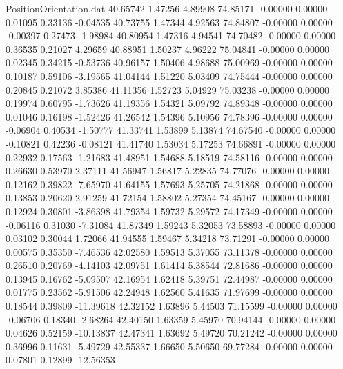 \begin{filecontents}{PositionOrientation.dat}
  40.65742    1.47256    4.89908    74.85171   -0.00000    0.00000    0.01095    0.33136   -0.04535
  40.73755    1.47344    4.92563    74.84807   -0.00000    0.00000   -0.00397    0.27473   -1.98984
  40.80954    1.47316    4.94541    74.70482   -0.00000    0.00000    0.36535    0.21027    4.29659
  40.88951    1.50237    4.96222    75.04841   -0.00000    0.00000    0.02345    0.34215   -0.53736
  40.96157    1.50406    4.98688    75.00969   -0.00000    0.00000    0.10187    0.59106   -3.19565
  41.04144    1.51220    5.03409    74.75444   -0.00000    0.00000    0.20845    0.21072    3.85386
  41.11356    1.52723    5.04929    75.03238   -0.00000    0.00000    0.19974    0.60795   -1.73626
  41.19356    1.54321    5.09792    74.89348   -0.00000    0.00000    0.01046    0.16198   -1.52426
  41.26542    1.54396    5.10956    74.78396   -0.00000    0.00000   -0.06904    0.40534   -1.50777
  41.33741    1.53899    5.13874    74.67540   -0.00000    0.00000   -0.10821    0.42236   -0.08121
  41.41740    1.53034    5.17253    74.66891   -0.00000    0.00000    0.22932    0.17563   -1.21683
  41.48951    1.54688    5.18519    74.58116   -0.00000    0.00000    0.26630    0.53970    2.37111
  41.56947    1.56817    5.22835    74.77076   -0.00000    0.00000    0.12162    0.39822   -7.65970
  41.64155    1.57693    5.25705    74.21868   -0.00000    0.00000    0.13853    0.20620    2.91259
  41.72154    1.58802    5.27354    74.45167   -0.00000    0.00000    0.12924    0.30801   -3.86398
  41.79354    1.59732    5.29572    74.17349   -0.00000    0.00000   -0.06116    0.31030   -7.31084
  41.87349    1.59243    5.32053    73.58893   -0.00000    0.00000    0.03102    0.30044    1.72066
  41.94555    1.59467    5.34218    73.71291   -0.00000    0.00000    0.00575    0.35350   -7.46536
  42.02580    1.59513    5.37055    73.11378   -0.00000    0.00000    0.26510    0.20769   -4.14103
  42.09751    1.61414    5.38544    72.81686   -0.00000    0.00000    0.13945    0.16762   -5.09507
  42.16954    1.62418    5.39751    72.44987   -0.00000    0.00000    0.01775    0.23562   -5.91506
  42.24948    1.62560    5.41635    71.97699   -0.00000    0.00000    0.18544    0.39809  -11.39618
  42.32152    1.63896    5.44503    71.15599   -0.00000    0.00000   -0.06706    0.18340   -2.68264
  42.40150    1.63359    5.45970    70.94144   -0.00000    0.00000    0.04626    0.52159  -10.13837
  42.47341    1.63692    5.49720    70.21242   -0.00000    0.00000    0.36996    0.11631   -5.49729
  42.55337    1.66650    5.50650    69.77284   -0.00000    0.00000    0.07801    0.12899  -12.56353

\end{filecontents}
